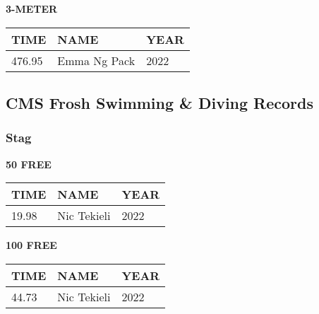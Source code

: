 \vspace{0.4cm}

\begin{center}
\begin{minipage}[t]{0.7\textwidth}
\centering
\textbf{3-METER}\\[0.05cm]
\begin{tabular}{@{}p{1.8cm}p{2.8cm}p{1.2cm}@{}}
\hline
\textbf{TIME} & \textbf{NAME} & \textbf{YEAR} \\
\hline
476.95 & Emma Ng Pack & 2022 \\
\hline
\end{tabular}
\end{minipage}
\end{center}

\vspace{0.4cm}

\newpage

\subsection{CMS Frosh Swimming \& Diving Records}
\subsubsection{Stag}

\begin{minipage}[t]{0.48\textwidth}
\centering
\textbf{50 FREE}\\[0.05cm]
\begin{tabular}{@{}p{1.8cm}p{2.8cm}p{1.2cm}@{}}
\hline
\textbf{TIME} & \textbf{NAME} & \textbf{YEAR} \\
\hline
19.98 & Nic Tekieli & 2022 \\
\hline
\end{tabular}
\end{minipage}\hfill
\begin{minipage}[t]{0.48\textwidth}
\centering
\textbf{100 FREE}\\[0.05cm]
\begin{tabular}{@{}p{1.8cm}p{2.8cm}p{1.2cm}@{}}
\hline
\textbf{TIME} & \textbf{NAME} & \textbf{YEAR} \\
\hline
44.73 & Nic Tekieli & 2022 \\
\hline
\end{tabular}
\end{minipage}

\vspace{0.4cm}

